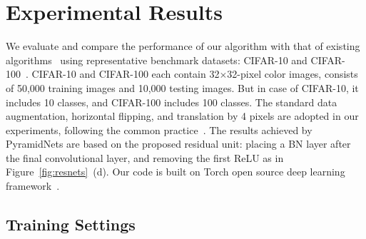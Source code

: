 \documentclass[10pt,twocolumn,letterpaper]{article}
\begin{document}



\section{Experimental Results}
\label{section:exp}




We evaluate and compare the performance of our algorithm with that of existing algorithms~\cite{resnet,preresnet,NiN,weightedresnet,wideresnet} using representative benchmark datasets: CIFAR-10 and CIFAR-100~\cite{cifar}. CIFAR-10 and CIFAR-100 each contain 32$\times$32-pixel color images, consists of 50,000 training images and 10,000 testing images. But in case of CIFAR-10, it includes 10 classes, and CIFAR-100 includes 100 classes. The standard data augmentation, horizontal flipping, and translation by 4 pixels are adopted in our experiments, following the common practice~\cite{NiN}. The results achieved by PyramidNets are based on the proposed residual unit: placing a BN layer after the final convolutional layer, and removing the first ReLU as in Figure~\ref{fig:resnets}~(d). Our code is built on Torch open source deep learning framework~\cite{torch7}.

\subsection{Training Settings}
\end{document}
